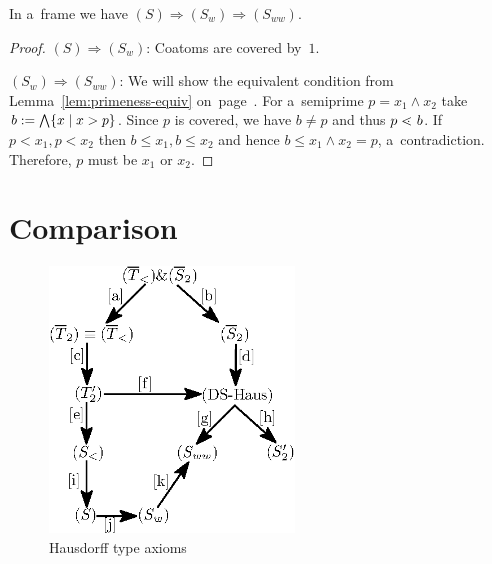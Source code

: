 \begin{prop} \label{prop:S->Sw->Sww}
  In a~frame we have $(S) \Rightarrow (S_w) \Rightarrow (S_{ww})$.
\end{prop}
\begin{proof}
  $(S) \Rightarrow (S_w)$:
  Coatoms are covered by~$1$.

  $(S_w) \Rightarrow (S_{ww})$:
  We will show the equivalent condition from Lemma~\ref{lem:primeness-equiv}
  on~page~\pageref{lem:primeness-equiv}.
  For a~semiprime $p = x_1 \wedge x_2$ take $b := \bigwedge \{ x \mid x > p \}$.
  Since $p$ is covered, we have $b \ne p$ and thus $p <\mkern-12mu\cdot\mkern8mu b$.
  If $p < x_1, p < x_2$ then $b \le x_1, b \le x_2$ and hence $b \le x_1 \wedge
  x_2 = p$, a~contradiction.
  Therefore, $p$ must be $x_1$ or $x_2$.
\end{proof}

\section{Comparison}

\begin{figure}[h]
  \centering
  \includegraphics[width=65mm]{../img/Hausdorff_diagram.eps}
  \caption{Hausdorff type axioms}
  \label{fig:haus-diagram}
\end{figure}

